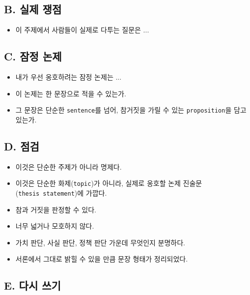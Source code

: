 \subsection{B. 실제 쟁점}\label{b-uxc2e4uxc81c-uxc7c1uxc810}

\begin{itemize}
\tightlist
\item
  이 주제에서 사람들이 실제로 다투는 질문은 ...
\end{itemize}

\subsection{C. 잠정 논제}\label{c-uxc7a0uxc815-uxb17cuxc81c}

\begin{itemize}
\tightlist
\item
  내가 우선 옹호하려는 잠정 논제는 ...
\item
  이 논제는 한 문장으로 적을 수 있는가.
\item
  그 문장은 단순한 \texttt{sentence}를 넘어, 참거짓을 가릴 수 있는 \texttt{proposition}을 담고 있는가.
\end{itemize}

\subsection{D. 점검}\label{d-uxc810uxac80}

\begin{itemize}
\tightlist
\item[$\square$]
  이것은 단순한 주제가 아니라 명제다.
\item[$\square$]
  이것은 단순한 화제(\texttt{topic})가 아니라, 실제로 옹호할 논제 진술문(\texttt{thesis\ statement})에 가깝다.
\item[$\square$]
  참과 거짓을 판정할 수 있다.
\item[$\square$]
  너무 넓거나 모호하지 않다.
\item[$\square$]
  가치 판단, 사실 판단, 정책 판단 가운데 무엇인지 분명하다.
\item[$\square$]
  서론에서 그대로 밝힐 수 있을 만큼 문장 형태가 정리되었다.
\end{itemize}

\subsection{E. 다시 쓰기}\label{e-uxb2e4uxc2dc-uxc4f0uxae30}

